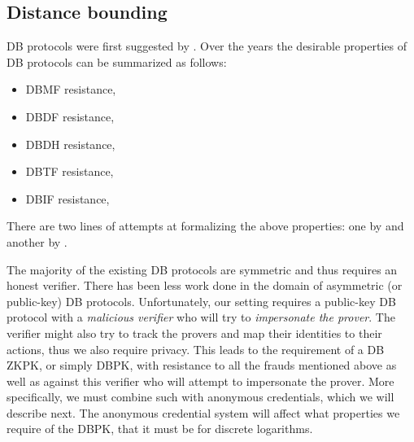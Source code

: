 \subsection{Distance bounding}%
\label{DistanceBounding}

\Ac{DB} protocols were first suggested by \citet{DistanceBounding}.
Over the years the desirable properties of \ac{DB} protocols can be summarized 
as follows:
\begin{itemize}
  \item \ac{DBMF} resistance,
  \item \ac{DBDF} resistance,
  \item \ac{DBDH} resistance,
  \item \ac{DBTF} resistance,
  \item \ac{DBIF} resistance,
\end{itemize}
There are two lines of attempts at formalizing the above properties: one by 
\citet{DB-BMV} and another by \citet{DB-DFKO}.

The majority of the existing \ac{DB} protocols are symmetric and thus requires 
an honest verifier.
There has been less work done in the domain of asymmetric (or public-key) 
\ac{DB} protocols.
Unfortunately, our setting requires a public-key \ac{DB} protocol with a 
\emph{malicious verifier} who will try to \emph{impersonate the prover}.
The verifier might also try to track the provers and map their identities to 
their actions, thus we also require privacy.
This leads to the requirement of a \ac{DB} \ac{ZKPK}, or simply \ac{DBPK}, with 
resistance to all the frauds mentioned above as well as against this verifier 
who will attempt to impersonate the prover.
More specifically, we must combine such  with anonymous credentials, 
which we will describe next.
The anonymous credential system will affect what properties we require of the 
\ac{DBPK}, \eg that it must be  for discrete logarithms.
